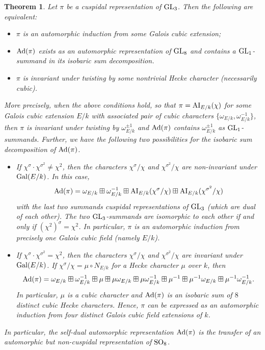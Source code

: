 \documentclass[11pt]{amsart}
\theoremstyle{plain}
\newtheorem{thm}[equation]{Theorem}
\numberwithin{equation}{section}
\def\GL{{\rm GL}}
\def\SO{{\rm SO}}
\begin{document}
\begin{thm} \label{T:AI1}
Let $\pi$ be a cuspidal representation of $\GL_3$. Then the following are equivalent:
\vskip 5pt
\begin{itemize}

\item[(i)] $\pi$ is an automorphic induction from  some Galois cubic extension;
\vskip 5pt

\item[(ii)] ${\rm Ad}(\pi)$ exists as an automorphic representation of $\GL_8$ and contains a $\GL_1$-summand in its isobaric sum decomposition. 
\vskip 5pt

\item[(iii)] $\pi$ is invariant under twisting by some nontrivial Hecke character (necessarily cubic). 
\end{itemize}
\vskip 10pt

\noindent More precisely, when the above conditions hold, so that $\pi ={\rm AI}_{E/k}(\chi)$ for some Galois cubic extension $E/k$ with associated pair of cubic characters 
$\{ \omega_{E/k}, \omega_{E/k}^{-1}\}$, then $\pi$ is invariant under twisting by $\omega_{E/k}^{\pm 1}$ and ${\rm Ad}(\pi)$ contains $\omega_{E/k}^{\pm 1}$ as $\GL_1$-summands.
Further,  we have the following two possibilities for the isobaric sum decomposition of ${\rm Ad}(\pi)$.
\vskip 5pt

\begin{itemize}
\item[(a)]  If $\chi^{\sigma} \cdot \chi^{\sigma^2} \ne  \chi^2$,  then the characters $\chi^{\sigma} / \chi$ and $\chi^{\sigma^2}/ \chi$ are non-invariant under ${\rm Gal}(E/k)$.
In this case, 
\[ {\rm Ad}(\pi) =  \omega_{E/k} \boxplus \omega_{E/k}^{-1} \boxplus  {\rm AI}_{E/k}( \chi^{\sigma}/ \chi) \boxplus {\rm AI}_{E/k}(\chi^{\sigma^2}/ \chi) \]
with the last two summands  cuspidal representations of $\GL_3$ (which are dual of each other). 
The two $\GL_3$-summands are isomorphic to each other if and only if $(\chi^2)^{\sigma} = \chi^2$. 
In particular, $\pi$ is an automorphic induction from precisely one Galois cubic field (namely $E/k$).
\vskip 5pt

 
\item[(b)]   If $\chi^{\sigma} \cdot \chi^{\sigma^2} =  \chi^2$, then the characters $\chi^{\sigma} / \chi$ and $\chi^{\sigma^2}/ \chi$ are invariant under ${\rm Gal}(E/k)$. If $\chi^{\sigma}/\chi = \mu \circ N_{E/k}$ for a Hecke character $\mu$ over $k$, then 
\[   {\rm Ad}(\pi) =  \omega_{E/k} \boxplus \omega_{E/k}^{-1} \boxplus  \mu \boxplus  \mu \omega_{E/k} \boxplus \mu \omega_{E/k}^{-1}  
\boxplus  \mu^{-1} \boxplus  \mu^{-1} \omega_{E/k} \boxplus \mu^{-1} \omega_{E/k}^{-1}. \]
In particular, $\mu$ is a cubic character and ${\rm Ad}(\pi)$ is an isobaric sum of $8$ distinct cubic Hecke characters. Hence, $\pi$ can be expressed as an automorphic induction from four distinct Galois cubic field extensions of $k$.
\end{itemize}
In particular, the self-dual automorphic representation ${\rm Ad}(\pi)$   is the transfer of an automorphic but non-cuspidal representation of $\SO_8$.
 \end{thm}
\vskip 5pt
\end{document}
